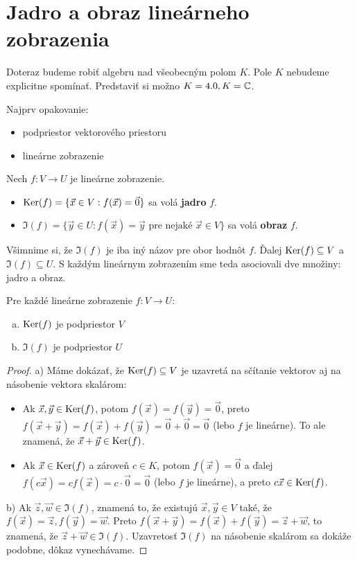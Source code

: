 \section{Jadro a obraz lineárneho zobrazenia}

Doteraz budeme robiť algebru nad všeobecným polom $K$. Pole $K$ nebudeme explicitne spomínať. Predstaviť si možno $K = 4.0, K = \mathbb{C}$.

Najprv opakovanie:
\begin{itemize}
    \item podpriestor vektorového priestoru
    \item lineárne zobrazenie
\end{itemize}

\begin{definicia} \label{def:jadro_a_obraz}
Nech $f: V \to U$ je lineárne zobrazenie.
\begin{itemize}
    \item $\operatorname{Ker}(f) = \{ \vec{x} \in V : f(\vec{x}) = \vec{0} \}$ sa volá \textbf{jadro} $f$.
    \item $\Im(f) = \{ \vec{y} \in U : f(\vec{x}) = \vec{y} \text{ pre nejaké } \vec{x} \in V \}$ sa volá \textbf{obraz} $f$.
\end{itemize}
\end{definicia}

Všimnime si, že $\Im(f)$ je iba iný názov pre obor hodnôt $f$.  Ďalej $\operatorname{Ker}(f) \subseteq V$ a $\Im(f) \subseteq U$.
S každým lineárnym zobrazením sme teda asociovali dve množiny: jadro a obraz.

\begin{tvrdenie} \label{tvr:podpriestory}
Pre každé lineárne zobrazenie $f: V \to U$:
\begin{enumerate}[a)]
    \item $\operatorname{Ker}(f)$ je podpriestor $V$
    \item $\Im(f)$ je podpriestor $U$
\end{enumerate}
\end{tvrdenie}

\begin{proof}
a) Máme dokázať, že $\operatorname{Ker}(f) \subseteq V$ je uzavretá na sčítanie vektorov aj na násobenie vektora skalárom:
\begin{itemize}
    \item Ak $\vec{x}, \vec{y} \in \operatorname{Ker}(f)$, potom $f(\vec{x}) = f(\vec{y}) = \vec{0}$, preto $f(\vec{x} + \vec{y}) = f(\vec{x}) + f(\vec{y}) = \vec{0} + \vec{0} = \vec{0}$ (lebo $f$ je lineárne). To ale znamená, že $\vec{x} + \vec{y} \in \operatorname{Ker}(f)$.
    \item Ak $\vec{x} \in \operatorname{Ker}(f)$ a zároveň $c \in K$, potom $f(\vec{x}) = \vec{0}$ a ďalej $f(c\vec{x}) = cf(\vec{x}) = c \cdot \vec{0} = \vec{0}$ (lebo $f$ je lineárne), a preto $c\vec{x} \in \operatorname{Ker}(f)$.
\end{itemize}
b) Ak $\vec{z}, \vec{w} \in \Im(f)$, znamená to, že existujú $\vec{x}, \vec{y} \in V$ také, že $f(\vec{x}) = \vec{z}, f(\vec{y}) = \vec{w}$. Preto $f(\vec{x} + \vec{y}) = f(\vec{x}) + f(\vec{y}) = \vec{z} + \vec{w}$, to znamená, že $\vec{z} + \vec{w} \in \Im(f)$. Uzavretosť $\Im(f)$ na násobenie skalárom sa dokáže podobne, dôkaz vynechávame.
\end{proof}

